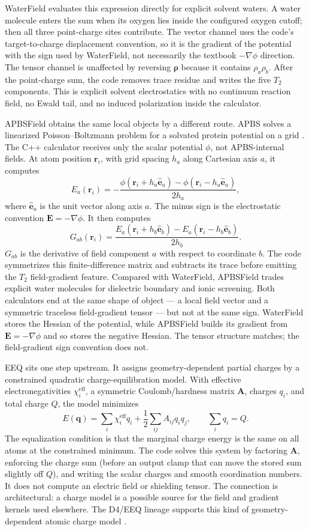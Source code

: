 \documentclass[11pt]{article}
\begin{document}
WaterField evaluates this expression directly for explicit solvent waters. A
water molecule enters the sum when its oxygen lies inside the configured oxygen
cutoff; then all three point-charge sites contribute. The vector channel uses
the code's target-to-charge displacement convention, so it is the gradient of
the potential with the sign used by WaterField, not necessarily the textbook
\(-\nabla\phi\) direction. The tensor channel is unaffected by reversing
\(\bm\rho\) because it contains \(\rho_a\rho_b\). After the point-charge sum,
the code removes trace residue and writes the five \(T_2\) components. This is
explicit solvent electrostatics with no continuum reaction field, no Ewald
tail, and no induced polarization inside the calculator.

APBSField obtains the same local objects by a different route. APBS solves a
linearized Poisson--Boltzmann problem for a solvated protein potential on a
grid \cite{baker2001}. The C++ calculator receives only the scalar potential
\(\phi\), not APBS-internal fields. At atom position \(\bm r_i\), with grid
spacing \(h_a\) along Cartesian axis \(a\), it computes
\[
  E_a(\bm r_i)
  =
  -\frac{
    \phi(\bm r_i+h_a\hat{\bm e}_a)
    -
    \phi(\bm r_i-h_a\hat{\bm e}_a)}
  {2h_a},
\]
where \(\hat{\bm e}_a\) is the unit vector along axis \(a\). The minus sign is
the electrostatic convention \(\bm E=-\nabla\phi\). It then computes
\[
  G_{ab}(\bm r_i)
  =
  \frac{
    E_a(\bm r_i+h_b\hat{\bm e}_b)
    -
    E_a(\bm r_i-h_b\hat{\bm e}_b)}
  {2h_b}.
\]
\(G_{ab}\) is the derivative of field component \(a\) with respect to coordinate
\(b\). The code symmetrizes this finite-difference matrix and subtracts its
trace before emitting the \(T_2\) field-gradient feature. Compared with
WaterField, APBSField trades explicit water molecules for dielectric boundary
and ionic screening. Both calculators end at the same shape of object --- a
local field vector and a symmetric traceless field-gradient tensor --- but not
at the same sign. WaterField stores the Hessian of the potential, while
APBSField builds its gradient from \(\bm E=-\nabla\phi\) and so stores the
negative Hessian. The tensor structure matches; the field-gradient sign
convention does not.

EEQ sits one step upstream. It assigns geometry-dependent partial charges by a
constrained quadratic charge-equilibration model. With effective
electronegativities \(\chi_i^{\mathrm{eff}}\), a symmetric Coulomb/hardness
matrix \(\bm A\), charges \(q_i\), and total charge \(Q\), the model minimizes
\[
  E(\bm q)
  =
  \sum_i \chi_i^{\mathrm{eff}}q_i
  +
  \frac12\sum_{ij} A_{ij}q_iq_j,
  \qquad
  \sum_i q_i=Q .
\]
The equalization condition is that the marginal charge energy is the same on
all atoms at the constrained minimum. The code solves this system by factoring
\(\bm A\), enforcing the charge sum (before an output clamp that can move the
stored sum slightly off \(Q\)), and writing the scalar charges and smooth
coordination numbers. It does not compute an electric field or shielding tensor.
The connection is architectural: a charge model is a possible source for the
field and gradient kernels used elsewhere. The D4/EEQ lineage supports this
kind of geometry-dependent atomic charge model \cite{caldeweyher2019,nistor2006}.
\end{document}
